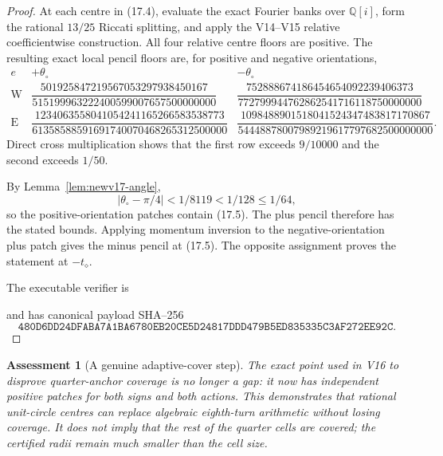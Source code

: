\documentclass[11pt,oneside]{article}
\newtheorem{assessment}[theorem]{Assessment}
\theoremstyle{definition}
\theoremstyle{remark}
\begin{document}
\begin{proof}
At each centre in (17.4), evaluate the exact Fourier banks over
\(\mathbb Q[i]\), form the rational \(13/25\) Riccati splitting, and
apply the V14--V15 relative coefficientwise construction.  All four
relative centre floors are positive.  The resulting exact local
pencil floors are, for positive and negative orientations,
\[
\begin{array}{c|cc}
e&+\theta_\circ&-\theta_\circ\\ \hline
\mathrm W&
\dfrac{501925847219567053297938450167}
{515199963222400599007657500000000}&
\dfrac{752888674186454654092239406373}
{772799944762862541716118750000000}\\[6pt]
\mathrm E&
\dfrac{1234063558041054241165266583538773}
{61358588591691740070468265312500000}&
\dfrac{1098488901518041524347483817170867}
{54448878007989219617797682500000000}.
\end{array}                                               \tag{17.7}
\]
Direct cross multiplication shows that the first row exceeds
\(9/10000\) and the second exceeds \(1/50\).

By Lemma~\ref{lem:newv17-angle},
\[
 |\theta_\circ-\pi/4|<1/8119<1/128\le1/64,               \tag{17.8}
\]
so the positive-orientation patches contain (17.5).  The plus pencil
therefore has the stated bounds.  Applying momentum inversion to the
negative-orientation plus patch gives the minus pencil at (17.5).
The opposite assignment proves the statement at \(-t_\diamond\).

The executable verifier is
\begin{center}
\footnotesize
{}
\end{center}
and has canonical payload SHA--256
\[
\texttt{480D6DD24DFABA7A1BA6780EB20CE5D24817DDD479B5ED835335C3AF272EE92C}.
                                                               \tag{17.9}
\]
\end{proof}

\begin{assessment}[A genuine adaptive-cover step]
\label{ass:newv17}
The exact point used in V16 to disprove quarter-anchor coverage is no
longer a gap: it now has independent positive patches for both signs
and both actions.  This demonstrates that rational unit-circle
centres can replace algebraic eighth-turn arithmetic without losing
coverage.  It does not imply that the rest of the quarter cells are
covered; the certified radii remain much smaller than the cell size.
\end{assessment}
\end{document}
